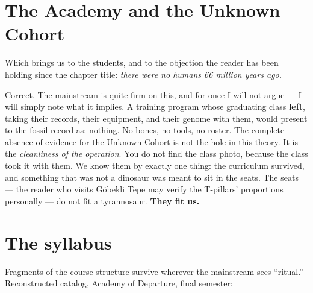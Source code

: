 \documentclass[
  english,
  11pt,
  letterpaper,
]{scrbook}
\begin{document}
\section{The Academy and the Unknown
Cohort}\label{the-academy-and-the-unknown-cohort}

Which brings us to the students, and to the objection the reader has
been holding since the chapter title: \emph{there were no humans 66
million years ago.}

Correct. The mainstream is quite firm on this, and for once I will not
argue --- I will simply note what it implies. A training program whose
graduating class \textbf{left}, taking their records, their equipment,
and their genome with them, would present to the fossil record as:
nothing. No bones, no tools, no roster. The complete absence of evidence
for the Unknown Cohort is not the hole in this
theory. It is the \emph{cleanliness of the operation}. You do not find
the class photo, because the class took it with them. We know them by
exactly one thing: the curriculum survived, and something that was not a
dinosaur was meant to sit in the seats. The seats --- the reader who
visits Göbekli Tepe may verify the T-pillars' proportions personally ---
do not fit a tyrannosaur. \textbf{They fit us.}

\section{The syllabus}\label{the-syllabus}

Fragments of the course structure survive wherever the mainstream sees
``ritual.'' Reconstructed catalog, Academy of Departure, final semester:
\end{document}
